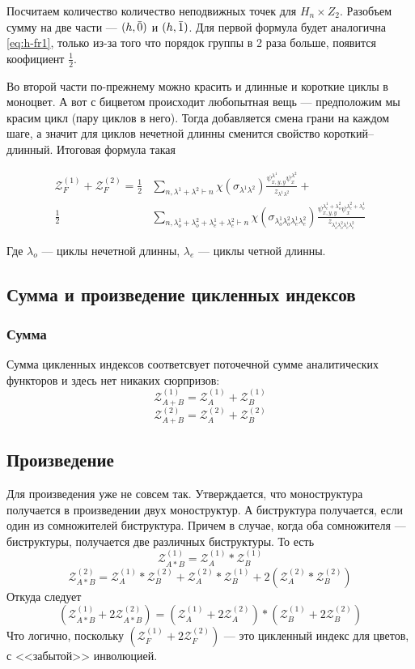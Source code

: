 Посчитаем количество количество неподвижных точек для $H_n \times Z_2$. Разобъем
сумму на две части --- $(h, \Bar 0)$ и $(h, \Bar 1)$. Для первой формула будет
аналогична \ref{eq:h-fr1}, только из-за того что порядок группы в 2 раза больше,
появится коофициент $\frac{1}{2}$.

Во второй части по-прежнему можно красить и длинные и короткие циклы в моноцвет.
А вот с бицветом происходит любопытная вещь --- предположим мы красим цикл (пару
циклов в него). Тогда добавляется смена грани на каждом шаге, а значит для
циклов нечетной длинны сменится свойство короткий--длинный. Итоговая формула
такая 

\begin{equation}
\label{eq:h-fr2}
\begin{split}
\mathcal Z_F^{(1)} + \mathcal Z_F^{(2)} = 
\frac{1}{2}&
\sum_{n, \lambda^1 + \lambda^2 \vdash n}\chi(\sigma_{\lambda^1 \lambda^2})
\frac{\psi_{x, y, y}^{\lambda^1} \psi_{x}^{\lambda^2}}{z_{\lambda^1 \lambda^2}}
+ \\
\frac{1}{2}&
\sum_{n, \lambda_o^1 + \lambda_o^2 + \lambda_e^1 + \lambda_e^2 \vdash
n}\chi(\sigma_{\lambda_o^1 \lambda_o^2 \lambda_e^1 \lambda_e^2})
\frac{\psi_{x, y, y}^{\lambda_e^1 + \lambda_o^2} \psi_{x}^{\lambda_e^2 + 
\lambda_o^1}}{z_{\lambda_o^1 \lambda_o^2 \lambda_e^1 \lambda_e^2}}
\end{split}
\end{equation}

Где $\lambda_o$ --- циклы нечетной длинны, $\lambda_e$ ---
циклы четной длинны.

\subsection{Сумма и произведение цикленных индексов}
\subsubsection{Сумма}
Сумма цикленных индексов соответсвует поточечной сумме аналитических
функторов и здесь нет никаких сюрпризов:
$$
\mathcal Z_{A + B}^{(1)} = \mathcal Z_A^{(1)} + \mathcal Z_B^{(1)}
$$
$$
\mathcal Z_{A + B}^{(2)} = \mathcal Z_A^{(2)} + \mathcal Z_B^{(2)}
$$
\subsection{Произведение}
Для произведения уже не совсем так. Утверждается, что моноструктура получается
в произведении двух моноструктур. А биструктура получается, если один из
сомножителей биструктура. Причем в случае, когда оба сомножителя ---
биструктуры, получается две различных биструктуры. То есть
$$
\mathcal Z_{A * B}^{(1)} = \mathcal Z_A^{(1)} * \mathcal Z_B^{(1)}
$$
$$
\mathcal Z_{A * B}^{(2)} = 
\mathcal Z_A^{(1)} * \mathcal Z_B^{(2)} + 
\mathcal Z_A^{(2)} * \mathcal Z_B^{(1)} +
2 (\mathcal Z_A^{(2)} * \mathcal Z_B^{(2)})
$$
Откуда следует
$$
(\mathcal Z_{A * B}^{(1)} + 2\mathcal Z_{A * B}^{(2)}) = 
(\mathcal Z_A^{(1)} + 2\mathcal Z_A^{(2)}) * 
(\mathcal Z_B^{(1)} + 2\mathcal Z_B^{(2)})
 $$
Что логично, поскольку $(\mathcal Z_F^{(1)} + 2\mathcal Z_F^{(2)})$ --- это
цикленный индекс для цветов, с <<забытой>> инволюцией.

